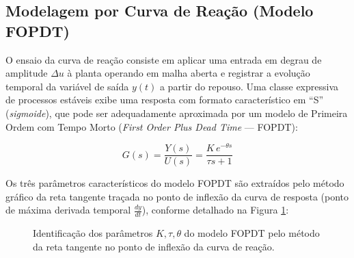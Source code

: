 \subsection{Modelagem por Curva de Reação (Modelo FOPDT)}
\label{subsec:fopdt}

O ensaio da curva de reação consiste em aplicar uma entrada em degrau de amplitude $\Delta u$ à planta operando em malha aberta e registrar a evolução temporal da variável de saída $y(t)$ a partir do repouso. Uma classe expressiva de processos estáveis exibe uma resposta com formato característico em ``S'' (\textit{sigmoide}), que pode ser adequadamente aproximada por um modelo de Primeira Ordem com Tempo Morto (\textit{First Order Plus Dead Time} --- FOPDT):

\begin{equation}
    G(s) = \frac{Y(s)}{U(s)} = \frac{K \, e^{-\theta s}}{\tau s + 1}
    \label{eq:fopdt}
\end{equation}

Os três parâmetros característicos do modelo FOPDT são extraídos pelo método gráfico da reta tangente traçada no ponto de inflexão da curva de resposta (ponto de máxima derivada temporal $\frac{dy}{dt}$), conforme detalhado na Figura \ref{fig:curva_reacao}:

\begin{figure}[htbp]
    \centering
    \caption{Identificação dos parâmetros $K, \tau, \theta$ do modelo FOPDT pelo método da reta tangente no ponto de inflexão da curva de reação.}
    \label{fig:curva_reacao}
    \vspace{0.1cm}
\end{figure}

